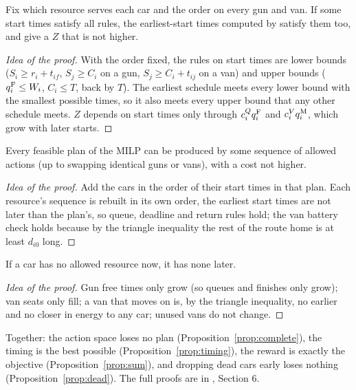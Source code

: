 \begin{proposition}\label{prop:timing}
Fix which resource serves each car and the order on every gun and van. If some start times satisfy all rules, the earliest-start times computed by  satisfy them too, and give a $Z$ that is not higher.
\end{proposition}
\begin{proof}[Idea of the proof]
With the order fixed, the rules on start times are lower bounds ($S_i\ge r_i+t_{if}$, $S_j\ge C_i$ on a gun, $S_j\ge C_i+t_{ij}$ on a van) and upper bounds ($q^{\mathrm{F}}_i\le W_i$, $C_i\le T$, back by $T$). The earliest schedule meets every lower bound with the smallest possible times, so it also meets every upper bound that any other schedule meets. $Z$ depends on start times only through $c^Q_iq^{\mathrm{F}}_i$ and $c^V_iq^{\mathrm{M}}_i$, which grow with later starts.
\end{proof}

\begin{proposition}\label{prop:complete}
Every feasible plan of the MILP can be produced by some sequence of allowed actions (up to swapping identical guns or vans), with a cost not higher.
\end{proposition}
\begin{proof}[Idea of the proof]
Add the cars in the order of their start times in that plan. Each resource's sequence is rebuilt in its own order, the earliest start times are not later than the plan's, so queue, deadline and return rules hold; the van battery check holds because by the triangle inequality the rest of the route home is at least $d_{i0}$ long.
\end{proof}

\begin{proposition}\label{prop:dead}
If a car has no allowed resource now, it has none later.
\end{proposition}
\begin{proof}[Idea of the proof]
Gun free times only grow (so queues and finishes only grow); van seats only fill; a van that moves on is, by the triangle inequality, no earlier and no closer in energy to any car; unused vans do not change.
\end{proof}

Together: the action space loses no plan (Proposition~\ref{prop:complete}), the timing is the best possible (Proposition~\ref{prop:timing}), the reward is exactly the objective (Proposition~\ref{prop:sum}), and dropping dead cars early loses nothing (Proposition~\ref{prop:dead}). The full proofs are in , Section 6.

